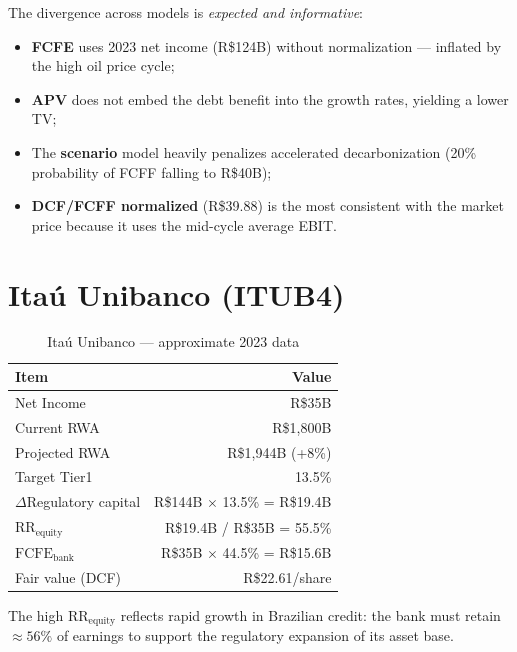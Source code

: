 \documentclass[12pt, a4paper, oneside]{book}
\newcommand{\FCFE}{\ensuremath{\mathrm{FCFE}}}
\newcommand{\RR}{\mathrm{RR}}
\begin{document}
\begin{warning}
The divergence across models is \emph{expected and informative}:
\begin{itemize}
  \item \textbf{FCFE} uses 2023 net income (R\$124B) without normalization ---
        inflated by the high oil price cycle;
  \item \textbf{APV} does not embed the debt benefit into the growth rates,
        yielding a lower TV;
  \item The \textbf{scenario} model heavily penalizes accelerated
        decarbonization (20\% probability of FCFF falling to R\$40B);
  \item \textbf{DCF/FCFF normalized} (R\$39.88) is the most consistent with
        the market price because it uses the mid-cycle average EBIT.
\end{itemize}
\end{warning}

\section{Itaú Unibanco (ITUB4)}

\begin{table}[h]
\centering
\caption{Itaú Unibanco --- approximate 2023 data}
\begin{tabular}{lr}
\toprule
\textbf{Item} & \textbf{Value} \\
\midrule
Net Income     & R\$35B \\
Current RWA    & R\$1{,}800B \\
Projected RWA  & R\$1{,}944B (+8\%) \\
Target Tier1   & 13.5\% \\
\midrule
$\Delta$Regulatory capital & R\$144B $\times$ 13.5\% = R\$19.4B \\
$\RR_{\text{equity}}$      & R\$19.4B / R\$35B = 55.5\% \\
$\FCFE_{\text{bank}}$      & R\$35B $\times$ 44.5\% = R\$15.6B \\
Fair value (DCF)           & R\$22.61/share \\
\bottomrule
\end{tabular}
\end{table}

The high $\RR_{\text{equity}}$ reflects rapid growth in Brazilian credit:
the bank must retain $\approx 56\%$ of earnings to support the regulatory
expansion of its asset base.

\end{document}
